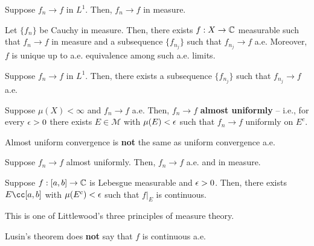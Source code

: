 \documentclass[11pt]{article}
\newcommand{\M}{\mathcal{M}}
\begin{document}
\begin{proposition}
Suppose $f_n\to f$ in $L^1$. Then, $f_n\to f$ in measure.
\end{proposition}

\begin{theorem}
Let $\{f_n\}$ be Cauchy in measure. Then, there exists $f: X\to\mathbb{C}$ measurable such that $f_n\to f$ in measure and a subsequence $\{f_{n_j}\}$ such that $f_{n_j}\to f$ a.e. Moreover, $f$ is unique up to a.e. equivalence among such a.e. limits.
\end{theorem}

\begin{corollary}
Suppose $f_n\to f$ in $L^1$. Then, there exists a subsequence $\{f_{n_j}\}$ such that $f_{n_j}\to f$ a.e.
\end{corollary}

\begin{theorem}[Egoroff]
Suppose $\mu(X)<\infty$ and $f_n\to f$ a.e. Then, $f_n\to f$ \textbf{almost uniformly} -- i.e., for every $\epsilon>0$ there exists $E\in\M$ with $\mu(E)<\epsilon$ such that $f_n\to f$ uniformly on $E^c$.
\end{theorem}

Almost uniform convergence is \textbf{not} the same as uniform convergence a.e.

\begin{proposition}
Suppose $f_n\to f$ almost uniformly. Then, $f_n\to f$ a.e. and in measure.
\end{proposition}

\begin{theorem}[Lusin]
Suppose $f: [a,b]\to\mathbb{C}$ is Lebesgue measurable and $\epsilon>0$. Then, there exists $E\cc[a,b]$ with $\mu(E^c)<\epsilon$ such that $f|_E$ is continuous.
\end{theorem}

\begin{remark}
This is one of Littlewood's three principles of measure theory. 
\end{remark}

Lusin's theorem does \textbf{not} say that $f$ is continuous a.e.
\end{document}
